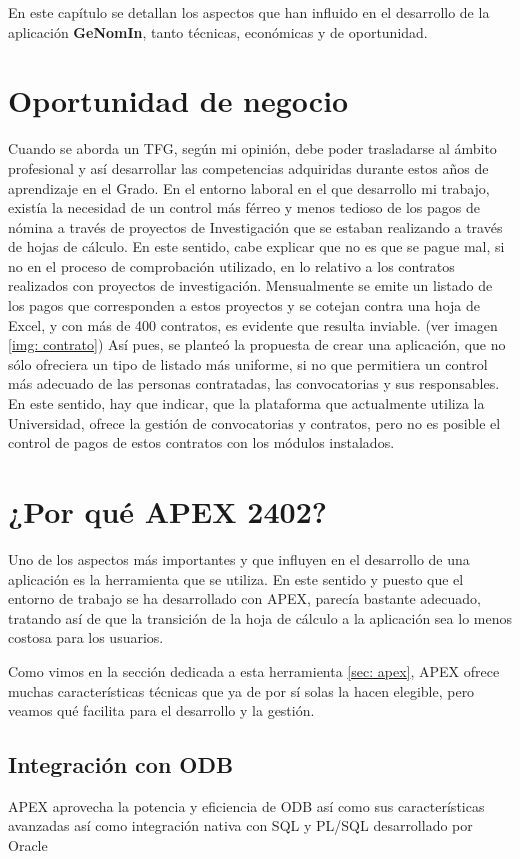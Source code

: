 En este capítulo se detallan los aspectos que han influido en el desarrollo de la aplicación \textbf{GeNomIn}, tanto técnicas, económicas y de oportunidad.

\section{Oportunidad de negocio}
Cuando se aborda un \acrshort{TFG}, según mi opinión, debe poder trasladarse al ámbito profesional y así desarrollar las competencias adquiridas durante estos años de aprendizaje en el Grado.
En el entorno laboral en el que desarrollo mi trabajo, existía la necesidad de un control más férreo y menos tedioso de los pagos de nómina a través de proyectos de Investigación que se estaban realizando a través de hojas de cálculo. En este sentido, cabe explicar que no es que se pague mal, si no en el proceso de comprobación utilizado, en  lo relativo a los contratos realizados con proyectos de investigación.
Mensualmente se emite un listado de los pagos que corresponden a estos proyectos y se cotejan contra una hoja de Excel, y con más de 400 contratos, es evidente que resulta inviable. (ver imagen \ref{img: contrato})
Así pues, se planteó la propuesta de crear una aplicación, que no sólo ofreciera un tipo de listado más uniforme, si no que permitiera un control más adecuado de las personas contratadas, las convocatorias y sus responsables.
En este sentido, hay que indicar, que la plataforma que actualmente utiliza la Universidad, ofrece la gestión de convocatorias y contratos, pero no es posible el control de pagos de estos contratos con los módulos instalados.

\section{¿Por qué APEX 2402?}
Uno de los aspectos más importantes y que influyen en el desarrollo de una aplicación es la herramienta que se utiliza. En este sentido y puesto que el entorno de trabajo se ha desarrollado con \acrshort{APEX}, parecía bastante adecuado, tratando así de que la transición de la hoja de cálculo a la aplicación sea lo menos costosa para los usuarios.

Como vimos en la sección dedicada a esta herramienta \ref{sec: apex},  \acrshort{APEX} ofrece muchas características técnicas que ya de por sí solas la hacen elegible, pero veamos qué facilita para el desarrollo y la gestión.
\subsection{Integración con \acrfull{ODB}}
\acrshort{APEX} aprovecha la potencia y eficiencia de \acrshort{ODB} así como sus características avanzadas así como integración nativa con \acrshort{SQL} y \acrshort{PL/SQL} desarrollado por Oracle ~\cite{OracleAPEXSQL}
